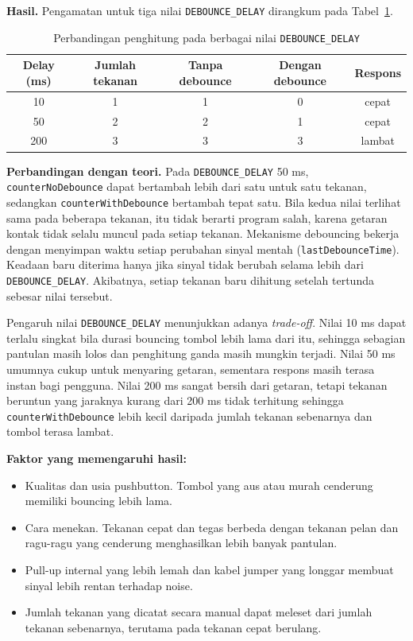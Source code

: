\textbf{Hasil.} Pengamatan untuk tiga nilai \texttt{DEBOUNCE\_DELAY} dirangkum pada Tabel~\ref{tab:p4}.

\begin{table}[H]
  \centering
  \caption{Perbandingan penghitung pada berbagai nilai \texttt{DEBOUNCE\_DELAY}}
  \label{tab:p4}
  \begin{tabular}{|c|c|c|c|c|}
    \hline
    Delay (ms) & Jumlah tekanan & Tanpa debounce & Dengan debounce & Respons \\
    \hline
    10  & 1 & 1 & 0 & cepat \\
    50  & 2 & 2 & 1 & cepat \\
    200 & 3 & 3 & 3 & lambat \\
    \hline
  \end{tabular}
\end{table}

\textbf{Perbandingan dengan teori.} Pada \texttt{DEBOUNCE\_DELAY} 50 ms, \texttt{counterNoDebounce} dapat bertambah lebih dari satu untuk satu tekanan, sedangkan \texttt{counterWithDebounce} bertambah tepat satu. Bila kedua nilai terlihat sama pada beberapa tekanan, itu tidak berarti program salah, karena getaran kontak tidak selalu muncul pada setiap tekanan. Mekanisme debouncing bekerja dengan menyimpan waktu setiap perubahan sinyal mentah (\texttt{lastDebounceTime}). Keadaan baru diterima hanya jika sinyal tidak berubah selama lebih dari \texttt{DEBOUNCE\_DELAY}. Akibatnya, setiap tekanan baru dihitung setelah tertunda sebesar nilai tersebut.

Pengaruh nilai \texttt{DEBOUNCE\_DELAY} menunjukkan adanya \textit{trade-off}. Nilai 10 ms dapat terlalu singkat bila durasi bouncing tombol lebih lama dari itu, sehingga sebagian pantulan masih lolos dan penghitung ganda masih mungkin terjadi. Nilai 50 ms umumnya cukup untuk menyaring getaran, sementara respons masih terasa instan bagi pengguna. Nilai 200 ms sangat bersih dari getaran, tetapi tekanan beruntun yang jaraknya kurang dari 200 ms tidak terhitung sehingga \texttt{counterWithDebounce} lebih kecil daripada jumlah tekanan sebenarnya dan tombol terasa lambat.

\textbf{Faktor yang memengaruhi hasil:}
\begin{itemize}
  \item Kualitas dan usia pushbutton. Tombol yang aus atau murah cenderung memiliki bouncing lebih lama.
  \item Cara menekan. Tekanan cepat dan tegas berbeda dengan tekanan pelan dan ragu-ragu yang cenderung menghasilkan lebih banyak pantulan.
  \item Pull-up internal yang lebih lemah dan kabel jumper yang longgar membuat sinyal lebih rentan terhadap noise.
  \item Jumlah tekanan yang dicatat secara manual dapat meleset dari jumlah tekanan sebenarnya, terutama pada tekanan cepat berulang.
\end{itemize}

